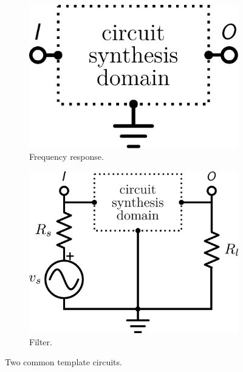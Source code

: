 \begin{figure}[ht]
\centering
\begin{subfigure}[b]{0.4\textwidth}
\centering
\includegraphics[scale = 0.20]{../ch6/figures/template_magnitude.pdf}
\caption{Frequency response.\label{fig:ch6:template:magnitude}}
\end{subfigure}%
\begin{subfigure}[b]{0.4\textwidth}
\centering
\includegraphics[scale = 0.20]{../ch6/figures/template_filter.pdf}
\caption{Filter.\label{fig:ch6:template:filter}}
\end{subfigure}%

\caption{Two common template circuits.\label{fig:ch6:template}}
\end{figure}

